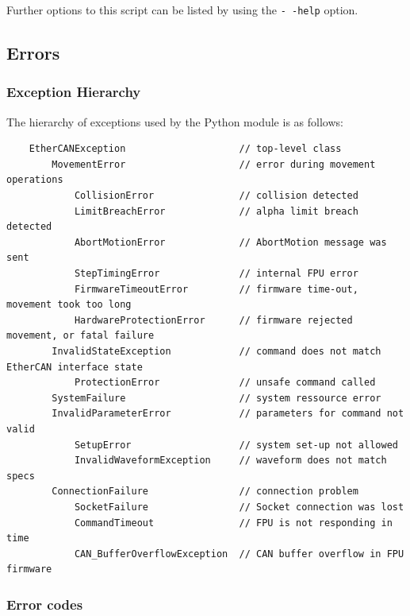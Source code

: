 \documentclass[11pt,a4paper]{report}
\begin{document}
Further options to this script can be listed by using the
\texttt{-\,-help} option.


\subsection{Errors}
\label{sec:errors}

\subsubsection{Exception Hierarchy}
\label{sec:ExceptionsReference}
The hierarchy of exceptions used by the Python module is as follows:

\begin{verbatim}
    EtherCANException                    // top-level class
        MovementError                    // error during movement operations
            CollisionError               // collision detected
            LimitBreachError             // alpha limit breach detected
            AbortMotionError             // AbortMotion message was sent
            StepTimingError              // internal FPU error
            FirmwareTimeoutError         // firmware time-out, movement took too long
            HardwareProtectionError      // firmware rejected movement, or fatal failure
        InvalidStateException            // command does not match EtherCAN interface state
            ProtectionError              // unsafe command called
        SystemFailure                    // system ressource error
        InvalidParameterError            // parameters for command not valid
            SetupError                   // system set-up not allowed
            InvalidWaveformException     // waveform does not match specs
        ConnectionFailure                // connection problem
            SocketFailure                // Socket connection was lost
            CommandTimeout               // FPU is not responding in time
            CAN_BufferOverflowException  // CAN buffer overflow in FPU firmware

\end{verbatim}

\subsubsection{Error codes}
\label{sec:errorcodes}
\end{document}
